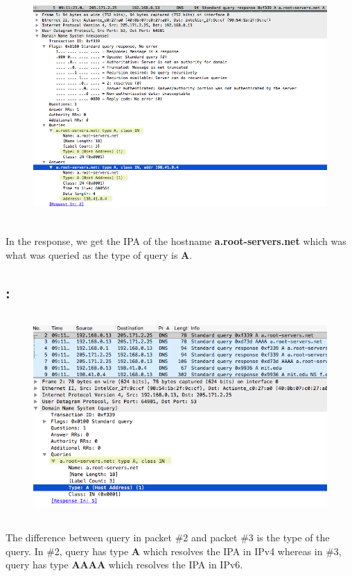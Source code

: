 \documentclass[]{report}
\begin{document}
\begin{figure}[H]
	\vspace{0pt}
	\includegraphics[height = 250pt, keepaspectratio]{Snapshots/q3/3_3_2.png}
\end{figure}

In the response, we get the IPA of the hostname \textbf{a.root-servers.net} which was what was queried as the type of query is \textbf{A}.

\subsection{:}
\begin{figure}[H]
	\vspace{0pt}
	\includegraphics[height = 220pt, keepaspectratio]{Snapshots/q3/3_4_1.png}
\end{figure}

The difference between query in packet \#2 and packet \#3 is the type of the query. In \#2, query has type \textbf{A} which resolves the IPA in IPv4 whereas in \#3, query has type \textbf{AAAA} which resolves the IPA in IPv6. 
\end{document}
